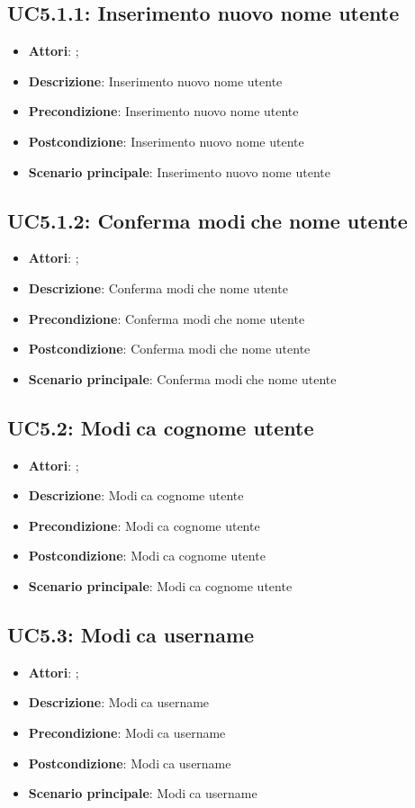 \subsection{UC5.1.1: Inserimento nuovo nome utente}
\label{UC5.1.1}
\begin{itemize}
\item \textbf{Attori}: ;
\item \textbf{Descrizione}: Inserimento nuovo nome utente
\item \textbf{Precondizione}: Inserimento nuovo nome utente
\item \textbf{Postcondizione}: Inserimento nuovo nome utente
\item \textbf{Scenario principale}:
Inserimento nuovo nome utente
\end{itemize}

\subsection{UC5.1.2: Conferma modiche nome utente}
\label{UC5.1.2}
\begin{itemize}
\item \textbf{Attori}: ;
\item \textbf{Descrizione}: Conferma modiche nome utente
\item \textbf{Precondizione}: Conferma modiche nome utente
\item \textbf{Postcondizione}: Conferma modiche nome utente
\item \textbf{Scenario principale}:
Conferma modiche nome utente
\end{itemize}

\subsection{UC5.2: Modica cognome utente}
\label{UC5.2}
\begin{itemize}
\item \textbf{Attori}: ;
\item \textbf{Descrizione}: Modica cognome utente
\item \textbf{Precondizione}: Modica cognome utente
\item \textbf{Postcondizione}: Modica cognome utente
\item \textbf{Scenario principale}:
Modica cognome utente
\end{itemize}

\subsection{UC5.3: Modica username}
\label{UC5.3}
\begin{itemize}
\item \textbf{Attori}: ;
\item \textbf{Descrizione}: Modica username
\item \textbf{Precondizione}: Modica username
\item \textbf{Postcondizione}: Modica username
\item \textbf{Scenario principale}:
Modica username
\end{itemize}

